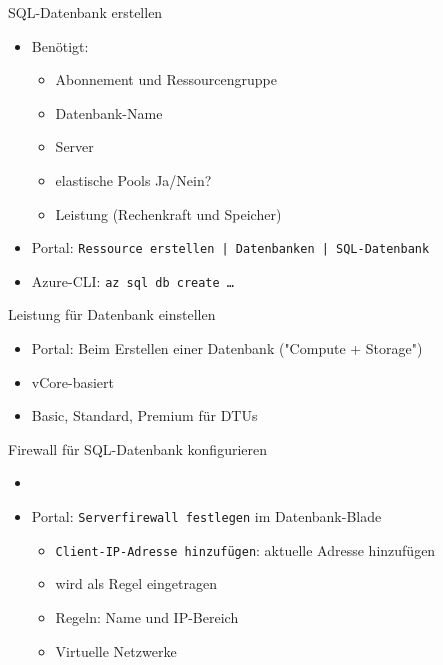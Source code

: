 \begin{flashcard}[Definition]{SQL-Datenbank erstellen}
    \begin{itemize}
        \item Benötigt:
            \begin{itemize}
                \item Abonnement und Ressourcengruppe
                \item Datenbank-Name
                \item Server
                \item elastische Pools Ja/Nein?
                \item Leistung (Rechenkraft und Speicher)
            \end{itemize}
        \item Portal: \texttt{Ressource erstellen | Datenbanken | SQL-Datenbank}
        \item Azure-CLI:\newline
            \texttt{az sql db create \ldots}
    \end{itemize}
\end{flashcard}

\begin{flashcard}[Definition]{Leistung für Datenbank einstellen}
    \begin{itemize}
        \item Portal: Beim Erstellen einer Datenbank ("Compute + Storage")
        \item vCore-basiert
        \item Basic, Standard, Premium für DTUs
    \end{itemize}
\end{flashcard}

\begin{flashcard}[Definition]{Firewall für SQL-Datenbank konfigurieren}
    \begin{itemize}
        \item
        \item Portal: \texttt{Serverfirewall festlegen} im Datenbank-Blade
        \begin{itemize}
            \item \texttt{Client-IP-Adresse hinzufügen}: aktuelle Adresse hinzufügen
            \item[$\Rightarrow$] wird als Regel eingetragen
            \item Regeln: Name und IP-Bereich
            \item Virtuelle Netzwerke
        \end{itemize}
    \end{itemize}
\end{flashcard}

